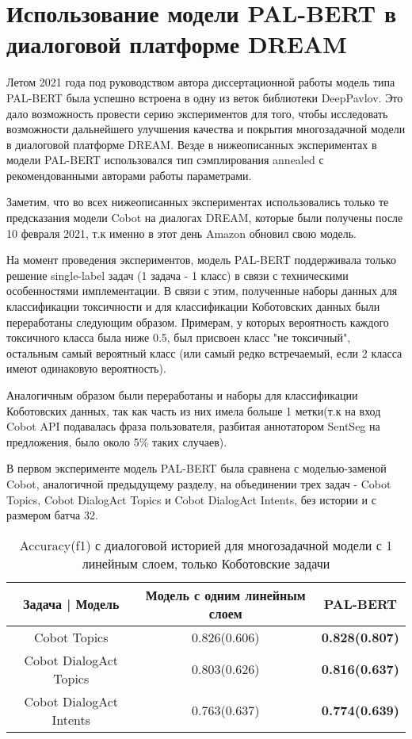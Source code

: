\section{Использование модели PAL-BERT в диалоговой платформе DREAM} 

Летом 2021 года под руководством автора диссертационной работы модель типа PAL-BERT \cite{stickland_2019} была успешно встроена в одну из веток библиотеки DeepPavlov. Это дало возможность провести серию экспериментов для того, чтобы исследовать возможности дальнейшего улучшения качества и покрытия многозадачной модели в диалоговой платформе DREAM. Везде в нижеописанных экспериментах в модели PAL-BERT использовался  тип сэмплирования annealed с рекомендованными авторами работы \cite{stickland_2019} параметрами.

Заметим, что во всех нижеописанных экспериментах использовались только те предсказания модели Cobot на диалогах DREAM, которые были получены после 10 февраля 2021, т.к именно в этот день Amazon обновил свою модель.

На момент проведения экспериментов, модель PAL-BERT поддерживала только решение single-label задач (1 задача - 1 класс) в связи с техническими особенностями имплементации. В связи с этим, полученные наборы данных для классификации токсичности и для классификации Коботовских данных были переработаны следующим образом. Примерам, у которых вероятность каждого токсичного класса была ниже 0.5, был присвоен класс "не токсичный", остальным самый вероятный класс (или самый редко встречаемый, если 2 класса имеют одинаковую вероятность).

Аналогичным образом были переработаны и наборы для классификации Коботовских данных, так как часть из них имела больше 1 метки(т.к на вход Cobot API  подавалась фраза пользователя, разбитая аннотатором SentSeg на предложения, было около 5\% таких случаев). 

В первом эксперименте модель PAL-BERT была сравнена с моделью-заменой Cobot, аналогичной предыдущему разделу, на объединении трех задач - Cobot Topics, Cobot DialogAct Topics и Cobot DialogAct Intents, без истории и с размером батча 32.

\begin{table}[htbp]
\centering
\caption {Accuracy(f1) с диалоговой историей для многозадачной модели с 1 линейным слоем, только Коботовские задачи}
\label{mtldream:3}
\begin{tabular}{|c||c|c|} \hline
Задача | Модель & Модель с одним линейным слоем & PAL-BERT \\
\hline
\hline
Cobot Topics & 0.826(0.606) & \textbf{0.828(0.807)} \\
\hline
Cobot DialogAct Topics & 0.803(0.626) & \textbf{0.816(0.637)} \\
\hline
Cobot DialogAct Intents & 0.763(0.637) & \textbf{0.774(0.639)} \\
\hline
\end{tabular}
\end{table}

